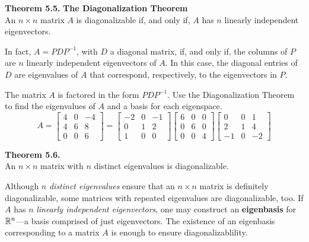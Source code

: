 \begin{boxthm}
	\textbf{Theorem 5.5.}
	\textbf{The Diagonalization Theorem} \\
	An $n\times n$ matrix $A$ is diagonalizable if, and only if, $A$ has $n$ linearly independent eigenvectors.
	
	In fact, $A=PDP^{-1}$, with $D$ a diagonal matrix, if, and only if, the columns of $P$ are $n$ linearly independent eigenvectors of $A$. In this case, the diagonal entries of $D$ are eigenvalues of $A$ that correspond, respectively, to the eigenvectors in $P$.
\end{boxthm}

\begin{exercise} %
	The matrix $A$ is factored in the form $PDP^{-1}$. Use the Diagonalization Theorem to find the eigenvalues of $A$ and a basis for each eigenspace.
	$$ A = \begin{bmatrix}4&0&-4\\4&6&8\\0&0&6\end{bmatrix} =
	\begin{bmatrix}-2&0&-1\\0&1&2\\1&0&0\end{bmatrix}
	\begin{bmatrix}6&0&0\\0&6&0\\0&0&4\end{bmatrix}
	\begin{bmatrix}0&0&1\\2&1&4\\-1&0&-2\end{bmatrix} $$
\end{exercise}
\vfill


\newpage

\begin{boxthm}
	\textbf{Theorem 5.6.} \\
	An $n\times n$ matrix with $n$ distinct eigenvalues is diagonalizable.
\end{boxthm}
\vspace{-1em}
\begin{boxdef}
	Although $n$ \emph{distinct eigenvalues} ensure that an $n\times n$ matrix is definitely diagonalizable, some matrices with repeated eigenvalues are diagonalizable, too. If $A$ has $n$ \emph{linearly independent eigenvectors}, one may construct an \textbf{eigenbasis} for $\mathbb{R}^n$---a basis comprised of just eigenvectors. The existence of an eigenbasis corresponding to a matrix $A$ is enough to ensure diagonalizablility.
\end{boxdef}


